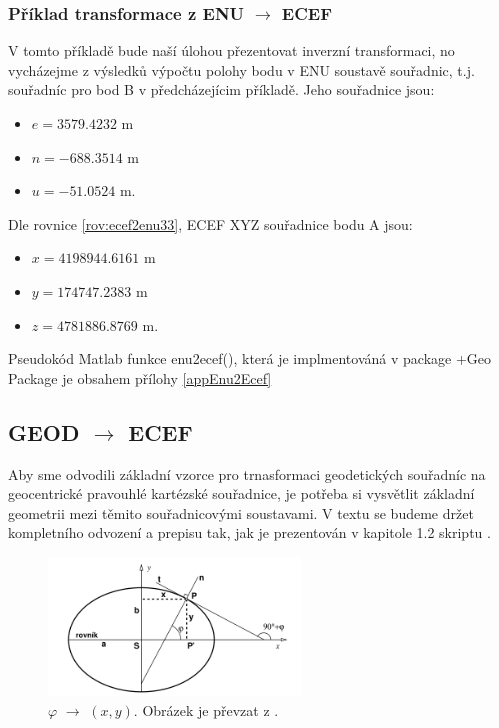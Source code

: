 \documentclass[11pt,a4paper]{article}
\begin{document}
\subsubsection{Příklad transformace z ENU $\rightarrow$ ECEF}

V tomto příkladě bude naší úlohou přezentovat inverzní transformaci, no vycházejme z výsledků výpočtu polohy bodu v ENU soustavě souřadnic, t.j. souřadníc pro bod B v předcházejícim příkladě. Jeho souřadnice jsou:

\begin{itemize}
\item $e = 3579.4232$ m
\item $n = -688.3514$ m
\item $u = -51.0524$ m.
\end{itemize}


Dle rovnice \ref{rov:ecef2enu33}, ECEF XYZ souřadnice bodu A jsou:
\begin{itemize}
\item $x = 4198944.6161$ m
\item $y = 174747.2383$ m
\item $z = 4781886.8769$ m.
\end{itemize}

Pseudokód Matlab funkce enu2ecef(), která je implmentováná v package +Geo Package je obsahem přílohy \ref{appEnu2Ecef}

\subsection{GEOD $\rightarrow$ ECEF}

Aby sme odvodili základní vzorce pro trnasformaci geodetických souřadníc na geocentrické pravouhlé kartézské souřadnice, je potřeba si vysvětlit základní geometrii mezi těmito souřadnicovými soustavami. V textu se budeme držet kompletního odvození a prepisu tak, jak je prezentován v kapitole 1.2 skriptu \cite{Cimbalnik1997}.


\begin{figure}[ht!]
\begin{center}

\includegraphics[width=0.60\textwidth]{FIG/CimbalnikObr1-14}
\caption{$\varphi$ $\rightarrow$ $\left(x, y\right)$. Obrázek je převzat z \cite{Cimbalnik1997}.}
\label{fig:cim114}
\end{center}
\end{figure}
\end{document}

